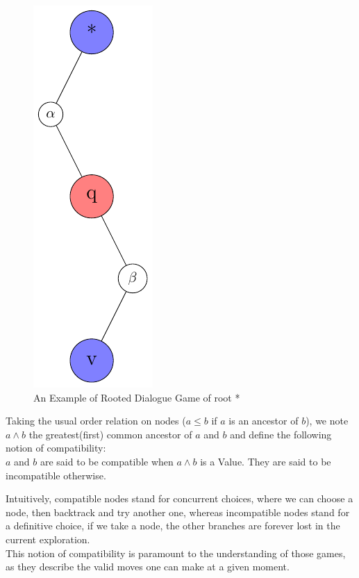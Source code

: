 \documentclass[a4paper,UKenglish]{lipics}
\begin{document}
\begin{figure}\centering\includegraphics[scale=0.6]{dialoguegame1.pdf}\caption{An Example of Rooted Dialogue Game of root *} \end{figure}

\begin{definition}
Taking the usual order relation on nodes ($a\leq b$ if $a$ is an ancestor of $b$), we note $a\wedge b$ the greatest(first) common ancestor of $a$ and $b$ and define the following notion of compatibility: \\
$a$ and $b$ are said to be compatible when $a\wedge b$ is a Value. They are said to be incompatible otherwise.
 
\end{definition}
Intuitively, compatible nodes stand for concurrent choices, where we can choose a node, then backtrack and try another one, whereas incompatible nodes stand for a definitive choice, if we take a node, the other branches are forever lost in the current exploration. \\

This notion of compatibility is paramount to the understanding of those games, as they describe the valid moves one can make at a given moment.\\
\end{document}
